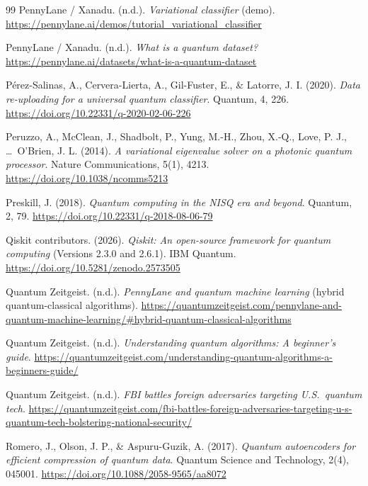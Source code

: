 \begin{thebibliography}{99}
	PennyLane / Xanadu. (n.d.).
	\emph{Variational classifier} (demo).
	\url{https://pennylane.ai/demos/tutorial_variational_classifier}

	PennyLane / Xanadu. (n.d.).
	\emph{What is a quantum dataset?}
	\url{https://pennylane.ai/datasets/what-is-a-quantum-dataset}

	Pérez-Salinas, A., Cervera-Lierta, A., Gil-Fuster, E., \& Latorre, J. I. (2020).
	\emph{Data re-uploading for a universal quantum classifier}.
	Quantum, 4, 226.
	\url{https://doi.org/10.22331/q-2020-02-06-226}

	Peruzzo, A., McClean, J., Shadbolt, P., Yung, M.-H., Zhou, X.-Q., Love, P. J., \ldots\ O'Brien, J. L. (2014).
	\emph{A variational eigenvalue solver on a photonic quantum processor}.
	Nature Communications, 5(1), 4213.
	\url{https://doi.org/10.1038/ncomms5213}

	Preskill, J. (2018).
	\emph{Quantum computing in the NISQ era and beyond}.
	Quantum, 2, 79.
	\url{https://doi.org/10.22331/q-2018-08-06-79}

	Qiskit contributors. (2026).
	\emph{Qiskit: An open-source framework for quantum computing} (Versions 2.3.0 and 2.6.1).
	IBM Quantum.
	\url{https://doi.org/10.5281/zenodo.2573505}

	Quantum Zeitgeist. (n.d.).
	\emph{PennyLane and quantum machine learning} (hybrid quantum-classical algorithms).
	\url{https://quantumzeitgeist.com/pennylane-and-quantum-machine-learning/#hybrid-quantum-classical-algorithms}

	Quantum Zeitgeist. (n.d.).
	\emph{Understanding quantum algorithms: A beginner's guide}.
	\url{https://quantumzeitgeist.com/understanding-quantum-algorithms-a-beginners-guide/}

	Quantum Zeitgeist. (n.d.).
	\emph{FBI battles foreign adversaries targeting U.S.\ quantum tech}.
	\url{https://quantumzeitgeist.com/fbi-battles-foreign-adversaries-targeting-u-s-quantum-tech-bolstering-national-security/}

	Romero, J., Olson, J. P., \& Aspuru-Guzik, A. (2017).
	\emph{Quantum autoencoders for efficient compression of quantum data}.
	Quantum Science and Technology, 2(4), 045001.
	\url{https://doi.org/10.1088/2058-9565/aa8072}


\end{thebibliography}
